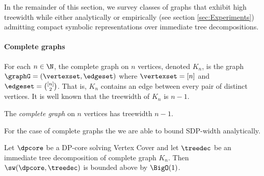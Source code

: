 
In the remainder of this section, we survey classes of graphs that exhibit high treewidth while either analytically or  empirically (see section \ref{sec:Experiments}) admitting compact symbolic representations over immediate tree decompositions.

\paragraph*{Complete graphs}
For each $n \in \N$, the complete graph on $n$ vertices, denoted $K_n$, is the graph $\graphG = (\vertexset,\edgeset)$ where $\vertexset = [n]$ and $\edgeset = \binom{[n]}{2}$. That is, $K_n$ contains an edge between every pair of distinct vertices. It is well known that the treewidth of $K_n$ is $n-1$.

\begin{observation}[Folklore]
    The \emph{complete graph} on $n$ vertices has treewidth $n-1$.
\end{observation}

For the case of complete graphs the we are able to bound SDP-width analytically. 

\begin{proposition} 
\label{proposition:WidthClique}
Let $\dpcore$ be a DP-core solving {\sc Vertex Cover} and let $\treedec$ be an immediate tree decomposition of complete graph $K_n$. Then $\sw(\dpcore, \treedec)$ is bounded above by $\BigO(1)$.
\end{proposition}

